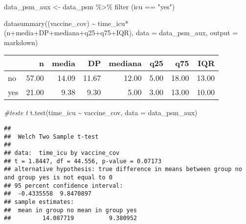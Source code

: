 \documentclass[
]{article}
\newenvironment{Shaded}{\begin{snugshade}}{\end{snugshade}}
\newcommand{\AttributeTok}[1]{\textcolor[rgb]{0.77,0.63,0.00}{#1}}
\newcommand{\CommentTok}[1]{\textcolor[rgb]{0.56,0.35,0.01}{\textit{#1}}}
\newcommand{\FunctionTok}[1]{\textcolor[rgb]{0.00,0.00,0.00}{#1}}
\newcommand{\NormalTok}[1]{#1}
\newcommand{\OtherTok}[1]{\textcolor[rgb]{0.56,0.35,0.01}{#1}}
\newcommand{\SpecialCharTok}[1]{\textcolor[rgb]{0.00,0.00,0.00}{#1}}
\newcommand{\StringTok}[1]{\textcolor[rgb]{0.31,0.60,0.02}{#1}}
\begin{document}
\begin{Shaded}
\begin{Highlighting}[]
\NormalTok{data\_psm\_aux }\OtherTok{\textless{}{-}}\NormalTok{ data\_psm }\SpecialCharTok{\%\textgreater{}\%} 
  \FunctionTok{filter}\NormalTok{ (icu }\SpecialCharTok{==} \StringTok{"yes"}\NormalTok{)}
\end{Highlighting}
\end{Shaded}

\begin{Shaded}
\begin{Highlighting}[]
\FunctionTok{datasummary}\NormalTok{((vaccine\_cov) }\SpecialCharTok{\textasciitilde{}}\NormalTok{ time\_icu}\SpecialCharTok{*}\NormalTok{(n}\SpecialCharTok{+}\NormalTok{media}\SpecialCharTok{+}\NormalTok{DP}\SpecialCharTok{+}\NormalTok{mediana}\SpecialCharTok{+}\NormalTok{q25}\SpecialCharTok{+}\NormalTok{q75}\SpecialCharTok{+}\NormalTok{IQR),}
            \AttributeTok{data =}\NormalTok{ data\_psm\_aux, }\AttributeTok{output =} \StringTok{\textquotesingle{}markdown\textquotesingle{}}\NormalTok{)}
\end{Highlighting}
\end{Shaded}

\begin{longtable}[]{@{}lrrrrrrr@{}}
\toprule
& n & media & DP & mediana & q25 & q75 & IQR \\
\midrule
\endhead
no & 57.00 & 14.09 & 11.67 & 12.00 & 5.00 & 18.00 & 13.00 \\
yes & 21.00 & 9.38 & 9.30 & 5.00 & 3.00 & 13.00 & 10.00 \\
\bottomrule
\end{longtable}

\begin{Shaded}
\begin{Highlighting}[]
\CommentTok{\#teste t}
\FunctionTok{t.test}\NormalTok{(time\_icu }\SpecialCharTok{\textasciitilde{}}\NormalTok{ vaccine\_cov, }\AttributeTok{data =}\NormalTok{ data\_psm\_aux)}
\end{Highlighting}
\end{Shaded}

\begin{verbatim}
## 
##  Welch Two Sample t-test
## 
## data:  time_icu by vaccine_cov
## t = 1.8447, df = 44.556, p-value = 0.07173
## alternative hypothesis: true difference in means between group no and group yes is not equal to 0
## 95 percent confidence interval:
##  -0.4335558  9.8470897
## sample estimates:
##  mean in group no mean in group yes 
##         14.087719          9.380952
\end{verbatim}
\end{document}

